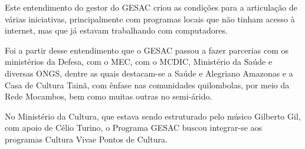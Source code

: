 \documentclass[
12pt,		%
openright,	%
twoside,  %
a4paper,			%
chapter=TITLE,		%
english,			%
french,				%
spanish,			%
brazil				%
]{USPSC-classe/USPSC}
\begin{document}
Este entendimento do gestor do GESAC criou as condi\c{c}\~oes para a articula\c{c}\~ao de v\'arias iniciativas, principalmente com programas locais que n\~ao tinham acesso \`a internet, mas que j\'a estavam trabalhando com computadores.














Foi a partir desse entendimento que o GESAC passou a fazer parcerias com os minist\'erios da Defesa, com o MEC, com o MCDIC,  Minist\'erio da Sa\'ude e diversas ONGS, dentre as quais destacam-se a \textquotedbl Sa\'ude e Alegria\textquotedbl   no Amazonas e a \textquotedbl Casa de Cultura Tain\~a\textquotedbl , com \^enfase nas comunidades quilombolas, por meio da Rede Mocambos, bem como muitas outras no semi-\'arido.














No Minist\'erio da Cultura, que estava sendo estruturado pelo m\'usico Gilberto Gil, com apoio de C\'elio Turino, o Programa GESAC buscou integrar-se aos programas \textquotedbl Cultura Viva\textquotedbl  e \textquotedbl Pontos de Cultura\textquotedbl .
\end{document}
